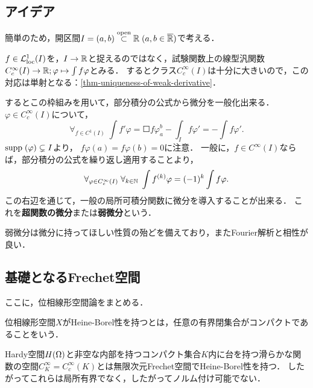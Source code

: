 \documentclass[uplatex,dvipdfmx]{jsreport}
\begin{document}
\subsection{アイデア}

簡単のため，開区間$I=(a,b)\overset{\mathrm{open}}{\subset}\mathbb{R}\;(a,b\in\overline{\mathbb{R}})$で考える．

\begin{discussion}[Rieszの表現流の発想の転換]
    $f\in\mathcal{L}^1_{\mathrm{loc}}(I)$を，$I\to\mathbb{R}$と捉えるのではなく，試験関数上の線型汎関数
    $C_c^\infty(I)\to\mathbb{R};\varphi\mapsto\int f\varphi$とみる．
    するとクラス$C_c^\infty(I)$は十分に大きいので，この対応は単射となる：\ref{thm-uniqueness-of-weak-derivative}．
\end{discussion}

\begin{discussion}[微分の導入]
    するとこの枠組みを用いて，部分積分の公式から微分を一般化出来る．
    $\varphi\in C_c^\infty(I)$について，
    \[\forall_{f\in C^1(I)}\;\int f'\varphi=\Square{f\varphi}^b_a-\int_If\varphi'=-\int f\varphi'.\]
    $\mathrm{supp}\;(\varphi)\subsetneq I$より，
    $f\varphi(a)=f\varphi(b)=0$に注意．
    一般に，$f\in C^\infty(I)$ならば，部分積分の公式を繰り返し適用することより，
    \[\forall_{\varphi\in C_c^\infty(I)}\;\forall_{k\in\mathbb{N}}\;\int f^{(k)}\varphi=(-1)^k\int f\varphi.\]
    この右辺を通じて，一般の局所可積分関数に微分を導入することが出来る．
    これを\textbf{超関数の微分}または\textbf{弱微分}という．
\end{discussion}

弱微分は微分に持ってほしい性質の殆どを備えており，またFourier解析と相性が良い．

\subsection{基礎となるFrechet空間}

\begin{tcolorbox}[colframe=ForestGreen, colback=ForestGreen!10!white,breakable,colbacktitle=ForestGreen!40!white,coltitle=black,fonttitle=\bfseries\sffamily,
title=]
    ここに，位相線形空間論をまとめる\cite{Rudin}．
\end{tcolorbox}

\begin{definition}
    位相線形空間$X$がHeine-Borel性を持つとは，任意の有界閉集合がコンパクトであることをいう．
\end{definition}

\begin{example}
    Hardy空間$H(\Omega)$と非空な内部を持つコンパクト集合$K$内に台を持つ滑らかな関数の空間$C^\infty_K=C^\infty_c(K)$とは無限次元Frechet空間でHeine-Borel性を持つ．
    したがってこれらは局所有界でなく，したがってノルム付け可能でない．
\end{example}
\end{document}
